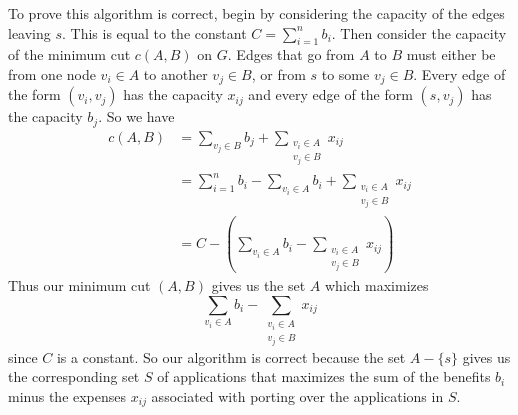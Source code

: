 \documentclass[12pt]{article}
\begin{document}
To prove this algorithm is correct, begin by considering the capacity of the edges leaving \(s\). This is equal to the constant \(C=\sum_{i=1}^n b_i\). Then consider the
capacity of the minimum cut \(c(A,B)\) on \(G\). Edges that go from \(A\) to \(B\) must either be from one node \(v_i\in A\) to another \(v_j\in B\), or from
\(s\) to some \(v_j\in B\). Every edge of the form \((v_i,v_j)\) has the capacity \(x_{ij}\) and every edge of the form \((s,v_j)\) has the capacity \(b_j\). So
we have
\begin{align*}
        c(A,B)&=\sum_{v_j\in B}b_j+\sum_{\substack{v_i\in A\\v_j\in B}}x_{ij}\\
        &=\sum_{i=1}^n b_i-\sum_{v_i\in A}b_i+\sum_{\substack{v_i\in A\\v_j\in B}}x_{ij}\\
        &=C-\left(\sum_{v_i\in A}b_i-\sum_{\substack{v_i\in A\\v_j\in B}}x_{ij}\right)
\end{align*}
Thus our minimum cut \((A,B)\) gives us the set \(A\) which maximizes
\[\sum_{v_i\in A}b_i-\sum_{\substack{v_i\in A\\v_j\in B}}x_{ij}\]
since \(C\) is a constant. So our algorithm is correct because the set \(A-\{s\}\) gives us the corresponding set \(S\) of applications that
maximizes the sum of the benefits \(b_i\) minus the expenses \(x_{ij}\) associated with porting over the applications in \(S\).
\end{document}
